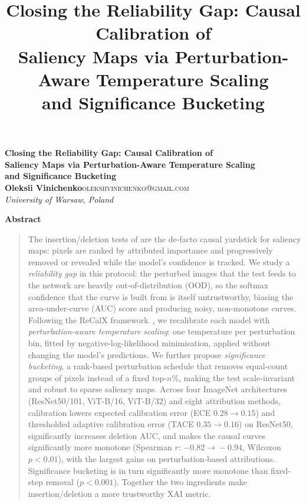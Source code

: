 \documentclass[11pt]{article}
\title{\bfseries Closing the Reliability Gap: Causal Calibration of\\
Saliency Maps via Perturbation-Aware Temperature Scaling\\ and Significance Bucketing}
\author{}
\date{}
\begin{document}
\thispagestyle{firstpage}

\begin{center}
  {\LARGE\bfseries Closing the Reliability Gap: Causal Calibration of\\[2pt]
  Saliency Maps via Perturbation-Aware Temperature Scaling\\[2pt]
  and Significance Bucketing}\\[1.2em]
  {\large\bfseries Oleksii Vinichenko}\hfill {\textsc{oleksiivinichenko@gmail.com}}\\[2pt]
  \textit{University of Warsaw, Poland}
\end{center}

\vspace{1em}

\begin{center}\textbf{Abstract}\end{center}
\begin{quote}
\small
The insertion/deletion tests of \citet{petsiuk2018rise} are the de-facto causal
yardstick for saliency maps: pixels are ranked by attributed importance and
progressively removed or revealed while the model's confidence is tracked. We
study a \emph{reliability gap} in this protocol: the perturbed images that the
test feeds to the network are heavily out-of-distribution (OOD), so the softmax
confidence that the curve is built from is itself untrustworthy, biasing the
area-under-curve (AUC) score and producing noisy, non-monotone curves. Following
the ReCalX framework~\citep{recalx2025}, we recalibrate each model with
\emph{perturbation-aware temperature scaling}: one temperature per perturbation
bin, fitted by negative-log-likelihood minimisation, applied without changing the
model's predictions. We further propose \emph{significance bucketing}, a
rank-based perturbation schedule that removes equal-count groups of pixels
instead of a fixed top-$n\%$, making the test scale-invariant and robust to
sparse saliency maps. Across four ImageNet architectures (ResNet50/101,
ViT-B/16, ViT-B/32) and eight attribution methods, calibration lowers
expected calibration error (ECE $0.28\!\to\!0.15$) and thresholded adaptive
calibration error (TACE $0.35\!\to\!0.16$) on ResNet50, significantly increases
deletion AUC, and makes the causal curves significantly more monotone (Spearman
$r$: $-0.82\!\to\!-0.94$, Wilcoxon $p<0.01$), with the largest gains on
perturbation-based attributions. Significance bucketing is in turn significantly
more monotone than fixed-step removal ($p<0.001$). Together the two ingredients
make insertion/deletion a more trustworthy XAI metric.
\end{quote}
\end{document}
